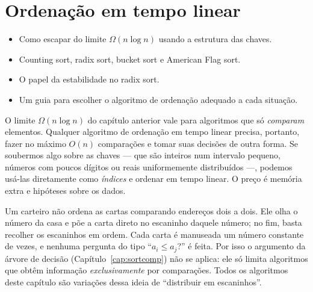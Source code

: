 \chapter{Ordenação em tempo linear}\label{cap:sortlin}\label{sec:sortlin}
\begin{objetivos}
\begin{itemize}
  \item Como escapar do limite $\Omega(n\log n)$ usando a estrutura das chaves.
  \item Counting sort, radix sort, bucket sort e American Flag sort.
  \item O papel da estabilidade no radix sort.
  \item Um guia para escolher o algoritmo de ordenação adequado a cada situação.
\end{itemize}
\end{objetivos}

O limite $\Omega(n\log n)$ do capítulo anterior vale para algoritmos que só \emph{comparam} elementos. Qualquer algoritmo de ordenação em tempo linear precisa, portanto, fazer no máximo $O(n)$ comparações e tomar suas decisões de outra forma. Se soubermos algo sobre as chaves --- que são inteiros num intervalo pequeno, números com poucos dígitos ou reais uniformemente distribuídos ---, podemos usá-las diretamente como \emph{índices} e ordenar em tempo linear. O preço é memória extra e hipóteses sobre os dados.

\begin{intuicao}
Um carteiro não ordena as cartas comparando endereços dois a dois. Ele olha o número da casa e põe a carta direto no escaninho daquele número; no fim, basta recolher os escaninhos em ordem. Cada carta é manuseada um número constante de vezes, e nenhuma pergunta do tipo ``$a_i\le a_j$?'' é feita. Por isso o argumento da árvore de decisão (Capítulo~\ref{cap:sortcomp}) não se aplica: ele só limita algoritmos que obtêm informação \emph{exclusivamente} por comparações. Todos os algoritmos deste capítulo são variações dessa ideia de ``distribuir em escaninhos''.
\end{intuicao}

